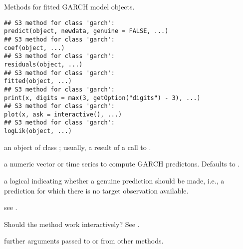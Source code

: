 \begin{Description}\relax
Methods for fitted GARCH model objects.
\end{Description}
\begin{Usage}
\begin{verbatim}
## S3 method for class 'garch':
predict(object, newdata, genuine = FALSE, ...)
## S3 method for class 'garch':
coef(object, ...)
## S3 method for class 'garch':
residuals(object, ...)
## S3 method for class 'garch':
fitted(object, ...)
## S3 method for class 'garch':
print(x, digits = max(3, getOption("digits") - 3), ...)
## S3 method for class 'garch':
plot(x, ask = interactive(), ...)
## S3 method for class 'garch':
logLik(object, ...)
\end{verbatim}
\end{Usage}
\begin{Arguments}
\begin{ldescription}
\item[\code{object, x}] an object of class ; usually, a result
of a call to .
\item[\code{newdata}] a numeric vector or time series to compute GARCH
predictons.  Defaults to .
\item[\code{genuine}] a logical indicating whether a genuine prediction
should be made, i.e., a prediction for which there is no target
observation available.
\item[\code{digits}] see .
\item[\code{ask}] Should the  method work interactively?  See
.
\item[\code{...}] further arguments passed to or from other methods.
\end{ldescription}
\end{Arguments}
